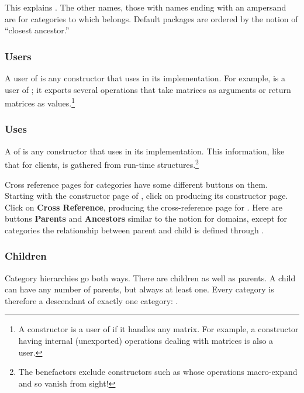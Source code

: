 This explains .
The other names, those with names ending with an ampersand \spadSyntax{&} are
for categories to which  belongs.
Default packages are ordered by the notion of ``closest ancestor.''

\subsubsection{Users}

A user of  is any constructor that uses
 in its implementation.
For example,  is a user of ; it
exports several operations that take matrices as arguments or return
matrices as values.\footnote{A constructor is a user of
 if it handles any matrix.
For example, a constructor having internal (unexported) operations
dealing with matrices is also a user.}

\subsubsection{Uses}

A  of  is any constructor that
 uses in its implementation.
This information, like that for clients, is gathered from run-time
structures.\footnote{The benefactors exclude constructors such as
 whose operations macro-expand and so vanish
from sight!}

Cross reference pages for categories have some different buttons on
them.
Starting with the constructor page of , click on
 producing its constructor page.
Click on {\bf Cross Reference},
producing the cross-reference page for .
Here are buttons {\bf Parents} and {\bf Ancestors} similar to the notion
for domains, except for categories the relationship between parent and
child is defined through .

\subsubsection{Children}

Category hierarchies go both ways.
There are children as well as parents.
A child can have any number of parents, but always at least one.
Every category is therefore a descendant of exactly one category:
.

